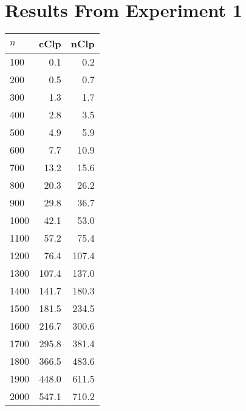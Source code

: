 \section{Results From Experiment 1}
\label{app:exp1}
\begin{tabular}{lrr}
     $n$ & cClp               & nClp \\ \hline
     100 &   0.1              &   0.2 \\
     200 &   0.5              &   0.7 \\
     300 &   1.3              &   1.7 \\
     400 &   2.8              &   3.5 \\
     500 &   4.9              &   5.9 \\
     600 &   7.7              &  10.9 \\
     700 &  13.2              &  15.6 \\
     800 &  20.3              &  26.2 \\
     900 &  29.8              &  36.7 \\
    1000 &  42.1              &  53.0 \\
    1100 &  57.2              &  75.4 \\
    1200 &  76.4              & 107.4 \\
    1300 & 107.4              & 137.0 \\
    1400 & 141.7              & 180.3 \\
    1500 & 181.5              & 234.5 \\
    1600 & 216.7              & 300.6 \\
    1700 & 295.8              & 381.4 \\
    1800 & 366.5              & 483.6 \\
    1900 & 448.0              & 611.5 \\
    2000 & 547.1              & 710.2
\end{tabular}

